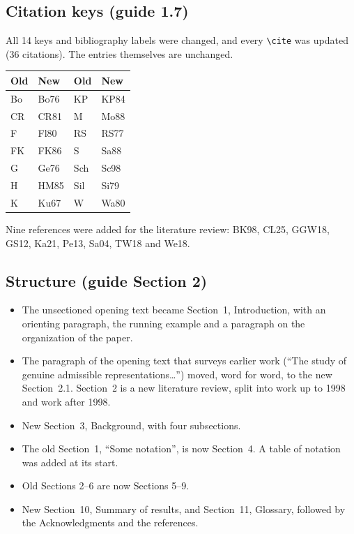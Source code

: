 \documentclass[12pt,letterpaper]{amsart}
\begin{document}
\subsection{Citation keys (guide 1.7)}
All 14 keys and bibliography labels were changed, and every \verb|\cite| was
updated (36 citations). The entries themselves are unchanged.

\begin{center}
\begin{tabular}{llll}
Old & New & Old & New\\ \hline
Bo & Bo76 & KP & KP84\\
CR & CR81 & M & Mo88\\
F & Fl80 & RS & RS77\\
FK & FK86 & S & Sa88\\
G & Ge76 & Sch & Sc98\\
H & HM85 & Sil & Si79\\
K & Ku67 & W & Wa80\\
\end{tabular}
\end{center}

Nine references were added for the literature review: BK98, CL25, GGW18,
GS12, Ka21, Pe13, Sa04, TW18 and We18.

\subsection{Structure (guide Section 2)}
\begin{itemize}
\item The unsectioned opening text became Section~1, Introduction, with an
orienting paragraph, the running example and a paragraph on the organization
of the paper.
\item The paragraph of the opening text that surveys earlier work (``The study
of genuine admissible representations\ldots'') moved, word for word, to the
new Section~2.1. Section~2 is a new literature review, split into work up to
1998 and work after 1998.
\item New Section~3, Background, with four subsections.
\item The old Section~1, ``Some notation'', is now Section~4. A table of
notation was added at its start.
\item Old Sections 2--6 are now Sections 5--9.
\item New Section~10, Summary of results, and Section~11, Glossary, followed
by the Acknowledgments and the references.
\end{itemize}
\end{document}
